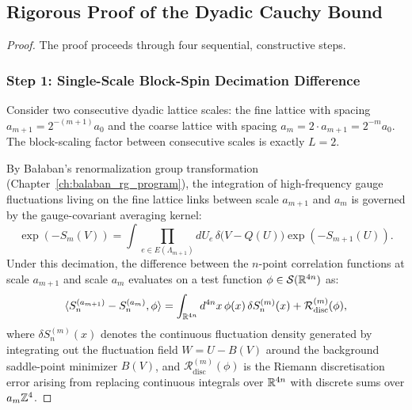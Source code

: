 \subsection{Rigorous Proof of the Dyadic Cauchy Bound}
\label{subsec:dyadic_cauchy_proof}

\begin{proof}
The proof proceeds through four sequential, constructive steps.

\subsubsection*{Step 1: Single-Scale Block-Spin Decimation Difference}
Consider two consecutive dyadic lattice scales: the fine lattice with spacing $a_{m+1} = 2^{-(m+1)} a_0$ and the coarse lattice with spacing $a_m = 2 \cdot a_{m+1} = 2^{-m} a_0$. The block-scaling factor between consecutive scales is exactly $L = 2$.

By Ba\l aban's renormalization group transformation (Chapter~\ref{ch:balaban_rg_program}), the integration of high-frequency gauge fluctuations living on the fine lattice links between scale $a_{m+1}$ and $a_m$ is governed by the gauge-covariant averaging kernel:
\begin{equation}
\exp\left( -S_m(V) \right) = \int \prod_{e \in E(\Lambda_{m+1})} dU_e \, \delta\bigl( V - Q(U) \bigr) \exp\left( -S_{m+1}(U) \right).
\end{equation}
Under this decimation, the difference between the $n$-point correlation functions at scale $a_{m+1}$ and scale $a_m$ evaluates on a test function $\phi \in \mathcal{S}(\mathbb{R}^{4n})$ as:
\begin{equation}
\label{eq:single_step_difference_integral}
\langle S_n^{(a_{m+1})} - S_n^{(a_m)}, \phi \rangle = \int_{\mathbb{R}^{4n}} d^{4n}x \, \phi(x) \, \delta S_n^{(m)}(x) + \mathcal{R}_{\mathrm{disc}}^{(m)}(\phi),
\end{equation}
where $\delta S_n^{(m)}(x)$ denotes the continuous fluctuation density generated by integrating out the fluctuation field $W = U - B(V)$ around the background saddle-point minimizer $B(V)$, and $\mathcal{R}_{\mathrm{disc}}^{(m)}(\phi)$ is the Riemann discretisation error arising from replacing continuous integrals over $\mathbb{R}^{4n}$ with discrete sums over $a_m \mathbb{Z}^4$.


\end{proof}
